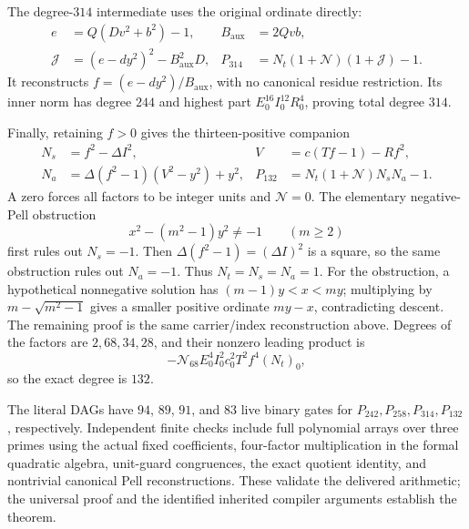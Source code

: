 The degree-$314$ intermediate uses the original ordinate directly:
\begin{align*}
 e&=Q(Dv^2+b^2)-1,& B_{\mathrm{aux}}&=2Qvb,\\
 \mathcal J&=(e-dy^2)^2-B_{\mathrm{aux}}^2D,&
 P_{314}&=N_t(1+\mathcal N)(1+\mathcal J)-1.
\end{align*}
It reconstructs $f=(e-dy^2)/B_{\mathrm{aux}}$, with no canonical residue
restriction.  Its inner norm has degree $244$ and highest part
$E_0^{16}I_0^{12}R_0^4$, proving total degree $314$.

Finally, retaining $f>0$ gives the thirteen-positive companion
\begin{align*}
 N_s&=f^2-\Delta I^2,&V&=c(Tf-1)-Rf^2,\\
 N_a&=\Delta(f^2-1)(V^2-y^2)+y^2,&
 P_{132}&=N_t(1+\mathcal N)N_sN_a-1.
\end{align*}
A zero forces all factors to be integer units and $\mathcal N=0$.
The elementary negative-Pell obstruction
\[
 x^2-(m^2-1)y^2\ne-1\qquad(m\ge2)
\]
first rules out $N_s=-1$.  Then $\Delta(f^2-1)=(\Delta I)^2$ is a
square, so the same obstruction rules out $N_a=-1$.  Thus $N_t=N_s=N_a=1$.
For the obstruction, a hypothetical nonnegative solution has
$(m-1)y<x<my$; multiplying by $m-\sqrt{m^2-1}$ gives a smaller positive
ordinate $my-x$, contradicting descent.  The remaining proof is the
same carrier/index reconstruction above.  Degrees of the factors are
$2,68,34,28$, and their nonzero leading product is
\[
 -\mathcal N_{68}E_0^4I_0^2c_0^2T^2f^4(N_t)_0,
\]
so the exact degree is $132$.

The literal DAGs have $94$, $89$, $91$, and $83$ live binary gates for
$P_{242},P_{258},P_{314},P_{132}$, respectively.  Independent finite checks
include full polynomial arrays over three primes using the actual fixed
coefficients, four-factor multiplication in the formal quadratic algebra,
unit-guard congruences, the exact quotient identity, and nontrivial canonical
Pell reconstructions.  These validate the delivered arithmetic; the universal
proof and the identified inherited compiler arguments establish the theorem.
